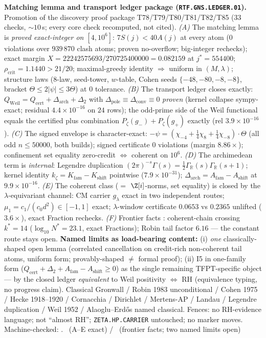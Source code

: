 \par\smallskip\noindent\textbf{Matching lemma and transport ledger package
(\texttt{RTF.GNS.LEDGER.01}).}
Promotion of the discovery proof package T78/T79/T80/T81/T82/T85 ($33$ checks,
$\sim10$\,s; every core check recomputed, not cited).
\emph{(A)} The matching lemma is \emph{proved exact-integer on $[4,10^6]$}:
$7S(j)<40A(j)$ at every atom ($0$ violations over $939\,870$ clash atoms;
proven no-overflow; big-integer rechecks); exact margin
$X=22242575693/270725400000=0.082159$ at $j^*=554400$;
$\rho_{\mathrm{crit}}=1.1440>21/20$; maximal-greedy identity $\Rightarrow$
uniform in $(M,\lambda)$; structure laws ($8$-law, seed-tower, $w$-table,
Cohen seeds $\{-48,-80,-8,-8\}$, bracket $\Theta\le2|\psi|\le3\Theta$) at $0$
tolerance.
\emph{(B)} The transport ledger closes exactly:
$Q_{\mathrm{Weil}}=Q_{\mathrm{cert}}+\Delta_{\mathrm{arch}}+\Delta_2$ with
$\Delta_{\mathrm{pole}}\equiv\Delta_{\mathrm{conv}}\equiv0$ \emph{proven}
(kernel collapse sympy-exact; residual $4.4\times10^{-16}$ on $24$ rows); the
odd-prime side of the Weil functional equals the certified plus combination
$P_\zeta(g_-)+P_\zeta(g_+)$ exactly (rel $3.9\times10^{-16}$).
\emph{(C)} The signed envelope is character-exact:
$-\psi=(\chi_{-4}+\tfrac14\chi_8+\tfrac14\chi_{-8})\cdot\Theta$ (all odd
$n\le50000$, both builds); signed certificate $0$ violations (margin
$8.86\times$); confinement set equality zero-credit $\Leftrightarrow$
coherent on $10^6$.
\emph{(D)} The archimedean term is \emph{internal}: Legendre duplication
$(2\pi)^{-s}\Gamma(s)=\tfrac12\Gamma_{\mathbb R}(s)\Gamma_{\mathbb R}(s{+}1)$;
kernel identity $k_\zeta=K_{\mathrm{fam}}-K_{\mathrm{shift}}$ pointwise
($7.9\times10^{-31}$);
$\Delta_{\mathrm{arch}}=A_{\mathrm{fam}}-A_{\mathrm{shift}}$ at
$9.9\times10^{-16}$.
\emph{(E)} The coherent class ($=$ $\Z[i]$-norms, set equality) is closed by
the $\lambda$-equivariant channel: CM carrier $g_\lambda$ exact in two
independent routes; $\mu_1=c_1/(c_0d^2)\in[-1,1]$ exact; $\lambda$-window
certificate $0.0653$ vs $0.2365$ unlifted ($3.6\times$), exact Fraction
rechecks.
\emph{(F)} Frontier facts \mC: coherent-chain crossing $k^*=14$
($\log_{10}N^*=23.1$, exact Fractions); Robin tail factor $6.16$ --- the
constant route stays open.
\textbf{Named limits as load-bearing content:} (i) \emph{one}
classically-shaped open lemma (correlated cancellation on credit-rich
non-coherent tail atoms, uniform form; provably-shaped $\neq$ formal proof);
(ii) I5 in one-family form
($Q_{\mathrm{cert}}+\Delta_2+A_{\mathrm{fam}}-A_{\mathrm{shift}}\ge0$) as the
single remaining TFPT-specific object --- by the closed ledger
\emph{equivalent} to Weil positivity $\Longleftrightarrow$ RH (equivalence
typing, no progress claim). Classical Gronwall / Robin 1983 unconditional /
Cohen 1975 / Hecke 1918--1920 / Cornacchia / Dirichlet / Mertens-AP / Landau /
Legendre duplication / Weil 1952 / Alaoglu--Erd\H{o}s named classical.
Fences: no RH-evidence language; not ``almost RH'';
\texttt{ZETA.HP.CARRIER} untouched; no marker moves.
Machine-checked: .
\mE\ (A--E exact) / \mC\ (frontier facts; two named limits open)


